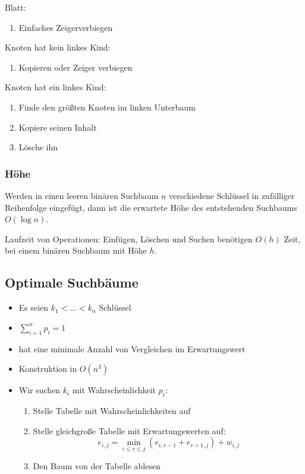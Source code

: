\documentclass[11pt]{scrartcl}
\begin{document}
Blatt:
\begin{enumerate}
	\item Einfaches Zeigerverbiegen
\end{enumerate}

Knoten hat kein linkes Kind:
\begin{enumerate}
	\item Kopieren oder Zeiger verbiegen
\end{enumerate}

Knoten hat ein linkes Kind:
\begin{enumerate}
	\item Finde den größten Knoten im linken Unterbaum
    \item Kopiere seinen Inhalt
    \item Lösche ihn
\end{enumerate}

\subsubsection{Höhe}

Werden in einen leeren binären Suchbaum $n$ verschiedene Schlüssel in zufälliger Reihenfolge eingefügt, dann ist die erwartete Höhe des entstehenden Suchbaums $O(\log n)$.

Laufzeit von Operationen: Einfügen, Löschen und Suchen benötigen $O(h)$ Zeit, bei einem binären Suchbaum mit Höhe $h$.

\subsection{Optimale Suchbäume}

\begin{itemize}
	\item Es seien $k_1 < ... < k_n$ Schlüssel
    \item $\sum_{i=1}^{n} p_i =1$
    \item hat eine minimale Anzahl von Vergleichen im Erwartungswert
    \item Konstruktion in $O(n^3)$
    \item Wir suchen $k_i$ mit Wahrscheinlichkeit $p_i$:
\begin{enumerate}
	\item Stelle Tabelle mit Wahrscheinlichkeiten auf
    \item Stelle gleichgroße Tabelle mit Erwartungswerten auf: $$e_{i,j}=\min_{i \leq r \leq j}(e_{i,r-1}+e_{r+1,j})+w_{i,j}$$
    \item Den Baum von der Tabelle ablesen
\end{enumerate}
\end{itemize}
\end{document}
